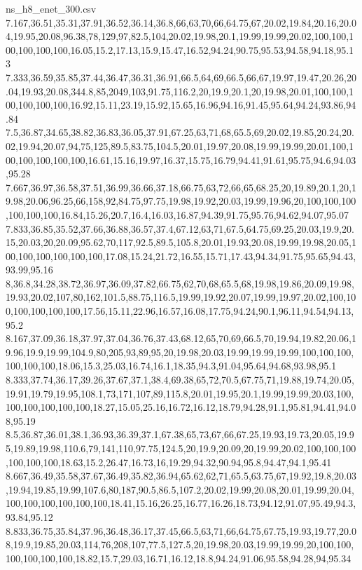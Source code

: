\begin{filecontents*}[overwrite]{ns_h8_enet_300.csv}
7.167,36.51,35.31,37.91,36.52,36.14,36.8,66,63,70,66,64.75,67,20.02,19.84,20.16,20.04,19.95,20.08,96.38,78,129,97,82.5,104,20.02,19.98,20.1,19.99,19.99,20.02,100,100,100,100,100,100,16.05,15.2,17.13,15.9,15.47,16.52,94.24,90.75,95.53,94.58,94.18,95.13
7.333,36.59,35.85,37.44,36.47,36.31,36.91,66.5,64,69,66.5,66,67,19.97,19.47,20.26,20.04,19.93,20.08,344.8,85,2049,103,91.75,116.2,20,19.9,20.1,20,19.98,20.01,100,100,100,100,100,100,16.92,15.11,23.19,15.92,15.65,16.96,94.16,91.45,95.64,94.24,93.86,94.84
7.5,36.87,34.65,38.82,36.83,36.05,37.91,67.25,63,71,68,65.5,69,20.02,19.85,20.24,20.02,19.94,20.07,94,75,125,89.5,83.75,104.5,20.01,19.97,20.08,19.99,19.99,20.01,100,100,100,100,100,100,16.61,15.16,19.97,16.37,15.75,16.79,94.41,91.61,95.75,94.6,94.03,95.28
7.667,36.97,36.58,37.51,36.99,36.66,37.18,66.75,63,72,66,65,68.25,20,19.89,20.1,20,19.98,20.06,96.25,66,158,92,84.75,97.75,19.98,19.92,20.03,19.99,19.96,20,100,100,100,100,100,100,16.84,15.26,20.7,16.4,16.03,16.87,94.39,91.75,95.76,94.62,94.07,95.07
7.833,36.85,35.52,37.66,36.88,36.57,37.4,67.12,63,71,67.5,64.75,69.25,20.03,19.9,20.15,20.03,20,20.09,95.62,70,117,92.5,89.5,105.8,20.01,19.93,20.08,19.99,19.98,20.05,100,100,100,100,100,100,17.08,15.24,21.72,16.55,15.71,17.43,94.34,91.75,95.65,94.43,93.99,95.16
8,36.8,34.28,38.72,36.97,36.09,37.82,66.75,62,70,68,65.5,68,19.98,19.86,20.09,19.98,19.93,20.02,107,80,162,101.5,88.75,116.5,19.99,19.92,20.07,19.99,19.97,20.02,100,100,100,100,100,100,17.56,15.11,22.96,16.57,16.08,17.75,94.24,90.1,96.11,94.54,94.13,95.2
8.167,37.09,36.18,37.97,37.04,36.76,37.43,68.12,65,70,69,66.5,70,19.94,19.82,20.06,19.96,19.9,19.99,104.9,80,205,93,89,95,20,19.98,20.03,19.99,19.99,19.99,100,100,100,100,100,100,18.06,15.3,25.03,16.74,16.1,18.35,94.3,91.04,95.64,94.68,93.98,95.1
8.333,37.74,36.17,39.26,37.67,37.1,38.4,69.38,65,72,70.5,67.75,71,19.88,19.74,20.05,19.91,19.79,19.95,108.1,73,171,107,89,115.8,20.01,19.95,20.1,19.99,19.99,20.03,100,100,100,100,100,100,18.27,15.05,25.16,16.72,16.12,18.79,94.28,91.1,95.81,94.41,94.08,95.19
8.5,36.87,36.01,38.1,36.93,36.39,37.1,67.38,65,73,67,66,67.25,19.93,19.73,20.05,19.95,19.89,19.98,110.6,79,141,110,97.75,124.5,20,19.9,20.09,20,19.99,20.02,100,100,100,100,100,100,18.63,15.2,26.47,16.73,16,19.29,94.32,90.94,95.8,94.47,94.1,95.41
8.667,36.49,35.58,37.67,36.49,35.82,36.94,65.62,62,71,65.5,63.75,67,19.92,19.8,20.03,19.94,19.85,19.99,107.6,80,187,90.5,86.5,107.2,20.02,19.99,20.08,20.01,19.99,20.04,100,100,100,100,100,100,18.41,15.16,26.25,16.77,16.26,18.73,94.12,91.07,95.49,94.3,93.84,95.12
8.833,36.75,35.84,37.96,36.48,36.17,37.45,66.5,63,71,66,64.75,67.75,19.93,19.77,20.08,19.9,19.85,20.03,114,76,208,107,77.5,127.5,20,19.98,20.03,19.99,19.99,20,100,100,100,100,100,100,18.82,15.7,29.03,16.71,16.12,18.8,94.24,91.06,95.58,94.28,94,95.34

\end{filecontents*}
